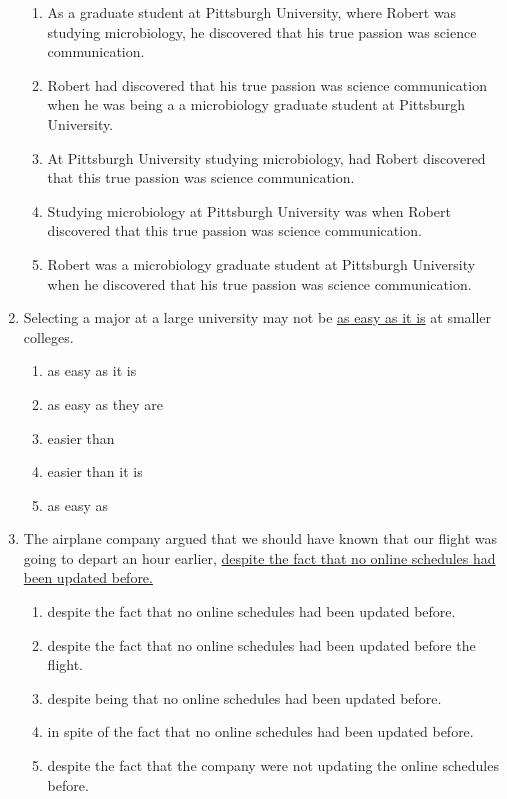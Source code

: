 \begin{enumerate}
\bigskip
\begin{enumerate}[label=(\Alph*)]
\item As a graduate student at Pittsburgh University, where Robert was studying microbiology, he discovered that his true passion was science communication.
\item Robert had discovered that his true passion was science communication when he was being a a microbiology graduate student at Pittsburgh University.
\item At Pittsburgh University studying microbiology, had Robert discovered that this true passion was science communication. 
\item Studying microbiology at Pittsburgh University was when Robert discovered that this true passion was science communication. 
\item Robert was a microbiology graduate student at Pittsburgh University when he discovered that his true passion was science communication.
\end{enumerate}

\item Selecting a major at a large university may not be \ul{as easy as it is} at smaller colleges. 

\bigskip
\begin{enumerate}[label=(\Alph*)]
\item as easy as it is
\item as easy as they are
\item easier than 
\item easier than it is
\item as easy as
\end{enumerate}


\item The airplane company argued that we should have known that our flight was going to depart an hour earlier, \ul{despite the fact that no online schedules had been updated before.}

\bigskip
\begin{enumerate}[label=(\Alph*)]
\item despite the fact that no online schedules had been updated before.
\item despite the fact that no online schedules had been updated before the flight. 
\item despite being that no online schedules had been updated before.
\item in spite of the fact that no online schedules had been updated before.
\item despite the fact that the company were not updating the online schedules before. 
\end{enumerate}


\end{enumerate}
